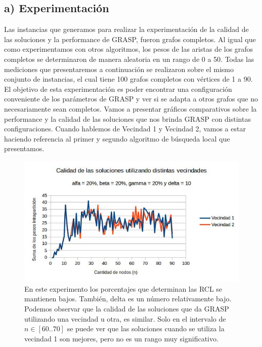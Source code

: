 \documentclass[a4paper]{article}
\begin{document}
\subsection*{a) Experimentación}
Las instancias que generamos para realizar la experimentación de la calidad de las soluciones y la performance de GRASP, fueron grafos completos. Al igual que como experimentamos con otros algoritmos, los pesos de las aristas de los grafos completos se determinaron de manera aleatoria en un rango de 0 a 50.
\newline Todas las mediciones que presentaremos a continuación se realizaron sobre el mismo conjunto de instancias, el cual tiene 100 grafos completos con vértices de 1 a 90.
\newline El objetivo de esta experimentación es poder encontrar una configuración conveniente de los parámetros de GRASP y ver si se adapta a otros grafos que no necesariamente sean completos.
\newline
\newline Vamos a presentar gráficos comparativos sobre la performance y la calidad de las soluciones que nos brinda GRASP con distintas configuraciones.
Cuando hablemos de Vecindad 1 y Vecindad 2, vamos a estar haciendo referencia al primer y segundo algoritmo de búsqueda local que presentamos.
\begin{figure}[H]
\centering
\includegraphics[scale=0.7]{20202010.jpg}\caption{En este experimento los porcentajes que determinan las RCL se mantienen bajos. También, delta es un número relativamente bajo. Podemos observar que la calidad de las soluciones que da GRASP utilizando una vecindad u otra, es similar. Solo en el intervalo de $n \in [60 .. 70]$ se puede ver que las soluciones cuando se utiliza la vecindad 1 son mejores, pero no es un rango muy significativo.}
\end{figure}
\end{document}
